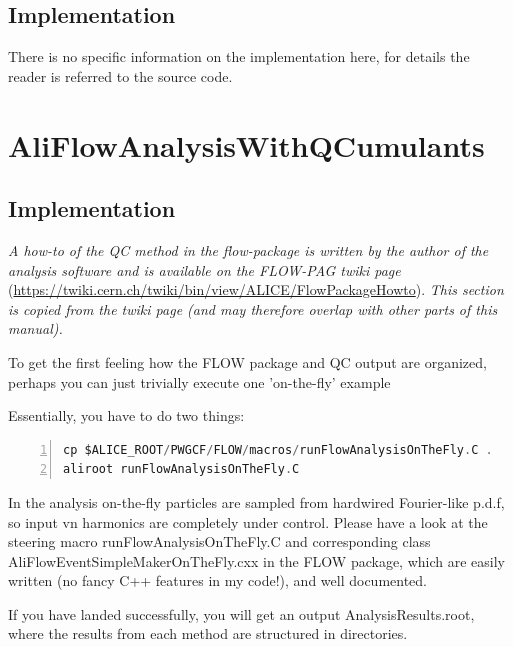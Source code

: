 \documentclass[a4paper]{book}
\numberwithin{equation}{subsection}
\begin{document}
\subsection{Implementation}
There is no specific information on the implementation here, for details the reader is referred to the source code.

\section{AliFlowAnalysisWithQCumulants}\label{sec:QC}
\subsection{Implementation}
\emph{A how-to of the QC method in the flow-package is written by the author of the analysis software and is available on the FLOW-PAG twiki page} (\href{https://twiki.cern.ch/twiki/bin/view/ALICE/FlowPackageHowto}{https://twiki.cern.ch/twiki/bin/view/ALICE/FlowPackageHowto}). \emph{This section is copied from the twiki page (and may therefore overlap with other parts of this manual).}

 To get the first feeling how the FLOW package and QC output are organized, perhaps you can just trivially execute one 'on-the-fly' example 

 Essentially, you have to do two things: 
	\begin{lstlisting}[language=C, numbers=left]
cp $ALICE_ROOT/PWGCF/FLOW/macros/runFlowAnalysisOnTheFly.C .
aliroot runFlowAnalysisOnTheFly.C \end{lstlisting}

 In the analysis on-the-fly particles are sampled from hardwired Fourier-like p.d.f, so input vn harmonics are completely under control. Please have a look at the steering macro runFlowAnalysisOnTheFly.C and corresponding class AliFlowEventSimpleMakerOnTheFly.cxx in the FLOW package, which are easily written (no fancy C++ features in my code!), and well documented. 

 If you have landed successfully, you will get an output AnalysisResults.root, where the results from each method are structured in directories. 
\end{document}
